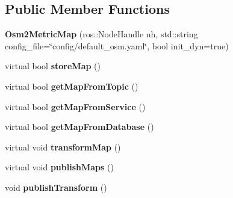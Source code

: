\subsection*{Public Member Functions}
\begin{DoxyCompactItemize}
\item 
\mbox{\label{classgr__map__utils_1_1Osm2MetricMap_a4391a81c50b65140bb99e5b309b96a22}} 
{\bfseries Osm2\+Metric\+Map} (ros\+::\+Node\+Handle nh, std\+::string config\+\_\+file=\char`\"{}config/default\+\_\+osm.\+yaml\char`\"{}, bool init\+\_\+dyn=true)
\item 
\mbox{\label{classgr__map__utils_1_1Osm2MetricMap_aaf96863289eacb03fa2a87e285d803d1}} 
virtual bool {\bfseries store\+Map} ()
\item 
\mbox{\label{classgr__map__utils_1_1Osm2MetricMap_a67377f8e1f6a456d58632b79549a5e58}} 
virtual bool {\bfseries get\+Map\+From\+Topic} ()
\item 
\mbox{\label{classgr__map__utils_1_1Osm2MetricMap_adeb6cf8a79bbf0ff13efc1f376b1b2bd}} 
virtual bool {\bfseries get\+Map\+From\+Service} ()
\item 
\mbox{\label{classgr__map__utils_1_1Osm2MetricMap_a594d6074b3760b51be4f7a2d1fafc7fc}} 
virtual bool {\bfseries get\+Map\+From\+Database} ()
\item 
\mbox{\label{classgr__map__utils_1_1Osm2MetricMap_aa2d77040708a5b215b8bdb89324503ff}} 
virtual void {\bfseries transform\+Map} ()
\item 
\mbox{\label{classgr__map__utils_1_1Osm2MetricMap_aba7b3d48e16bbdc61756672e807d67ce}} 
virtual void {\bfseries publish\+Maps} ()
\item 
\mbox{\label{classgr__map__utils_1_1Osm2MetricMap_a5f117b4a2c6779116ec14d859d40ee61}} 
void {\bfseries publish\+Transform} ()
\item 
\mbox{\label{classgr__map__utils_1_1Osm2MetricMap_a2b526463b77e2bdf782c8e19a6f4ce4a}} 

\end{DoxyCompactItemize}
